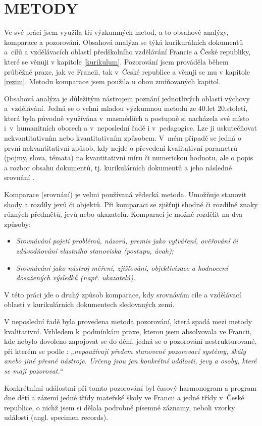 
\chapter{METODY}
\label{metody}

Ve své práci jsem využila tří výzkumných metod, a to obsahové analýzy, komparace a pozorování. Obsahová analýza se týká kurikurálních dokumentů a cílů a vzdělávacích oblastí předškolního vzdělávání Francie a České republiky, které se věnuji v kapitole \ref{kurikulum}. Pozorování jsem prováděla během průběžné praxe, jak ve Francii, tak v České republice a věnuji se mu v kapitole \ref{rezim}. Metodu komparace jsem použila u obou zmiňovaných kapitol. 

Obsahová analýza je důležitým nástrojem poznání jednotlivých oblastí výchovy a vzdělávání. Jedná se o velmi mladou výzkumnou metodu ze 40.let 20.století, která byla původně využívána v masmédiích a postupně si nacházela své místo i v humanitních oborech a v neposlední řadě i v pedagogice. Lze ji uskutečňovat nekvantitativním nebo kvantitativním způsobem. V mém případě se jedná o první nekvantitativní způsob, kdy nejde o převedení kvalitativní parametrů (pojmy, slova, témata) na kvantitativní míru či numerickou hodnotu, ale o popis a rozbor obsahu dokumentů, tj. kurikulárních dokumentů a jeho následné srovnání \citep{Gavora08}.

Komparace (srovnání) je velmi používaná vědecká metoda. Umožňuje stanovit shody a rozdíly jevů či objektů. Při komparaci se zjišťují shodné či rozdílné znaky různých předmětů, jevů nebo ukazatelů. 
Komparaci je možné rozdělit na dva způsoby:
\begin{itemize}
\item []\textit{Srovnávání pojetí problémů, názorů, premis jako vytváření, ověřování či zdůvodňování vlastního stanoviska (postupu, úvah);}
\item []\textit{Srovnávání jako nástroj měření, zjišťování, objektivizace a hodnocení dosažených výsledků (např. ukazatelů).} \citep[s.~19]{Siroky}
\end{itemize}
V této práci jde o druhý způsob komparace, kdy srovnávám cíle a vzdělávací oblasti v kurikulárních dokumentech sledovaných zemí.  

V neposlední řadě byla provedena metoda pozorování, která spadá mezi metody kvalitativní. Vzhledem k podmínkám praxe, kterou jsem absolvovala ve Francii, kde nebylo dovoleno zapojovat se do dění, jedná se o pozorování nestrukturované, při kterém se podle \citet[s.~17]{Gavora96}: \textit{„nepoužívají předem stanovené pozorovací systémy, škály anebo jiné přesné nástroje. Určeny jsou jen konkrétní události, jevy a osoby, které se mají pozorovat.“} 

Konkrétními událostmi při tomto pozorování byl časový harmonogram a program dne dětí a zázemí jedné třídy mateřské školy ve Francii a jedné třídy v České republice, o nichž jsem si dělala podrobné písemné záznamy, neboli vzorky událostí (angl. specimen records). 
